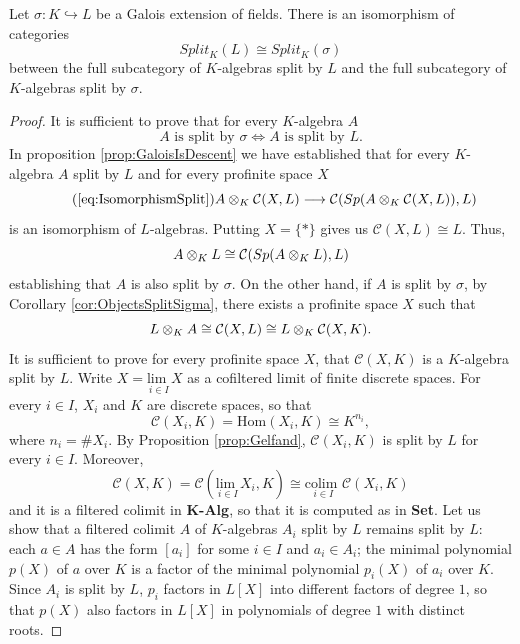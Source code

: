 \begin{proposition}
\label{prop:Split=Split}
    Let $\sigma: K\hookrightarrow L$ be a Galois extension of fields. There is an isomorphism of categories
    \[ Split_K(L)\cong Split_K(\sigma) \]
    between the full subcategory of $K$-algebras split by $L$ and the full subcategory of $K$-algebras split by $\sigma$.
    \begin{proof}
        It is sufficient to prove that for every $K$-algebra $A$
        \[ A \text{ is split by }\sigma \iff A \text{ is split by }L. \]
        In proposition \ref{prop:GaloisIsDescent} we have established that for every $K$-algebra $A$ split by $L$ and for every profinite space $X$
        \begin{equation}\tag{\ref{eq:IsomorphismSplit}}
            A\tens{K}\mathcal{C}(X,L)\longrightarrow \mathcal{C}(Sp(A\tens{K}\mathcal{C}(X,L)),L)
        \end{equation}
        is an isomorphism of $L$-algebras. Putting $X = \{*\}$ gives us $\mathcal{C}(X,L)\cong L$. Thus,
        \[ A\otimes_{K}L\cong \mathcal{C}(Sp(A\otimes_{K}L), L) \]
        establishing that $A$ is also split by $\sigma$. On the other hand, if $A$ is split by $\sigma$, by Corollary \ref{cor:ObjectsSplitSigma}, there exists a profinite space $X$ such that
        \[ L\otimes_{K}A\cong \mathcal{C}(X,L)\cong L\otimes_{K}\mathcal{C}(X,K). \]
        It is sufficient to prove for every profinite space $X$, that $\mathcal{C}(X,K)$ is a $K$-algebra split by $L$. Write $X = \underset{i\in I}{\text{lim }}X$ as a cofiltered limit of finite discrete spaces. For every $i\in I$, $X_i$ and $K$ are discrete spaces, so that
        \[ \mathcal{C}(X_i, K) = \text{Hom}(X_i, K)\cong K^{n_i}, \]
        where $n_i = \# X_i$. By Proposition \ref{prop:Gelfand}, $\mathcal{C}(X_i,K)$ is split by $L$ for every $i\in I$. Moreover,
        \[ \mathcal{C}(X,K) = \mathcal{C}(\underset{i\in I}{\text{lim }}X_i, K)\cong \underset{i\in I}{\text{colim }}\mathcal{C}(X_i, K) \]
        and it is a filtered colimit in \textbf{K-Alg}, so that it is computed as in \textbf{Set}. Let us show that a filtered colimit $A$ of $K$-algebras $A_i$ split by $L$ remains split by $L$: each $a\in A$ has the form $[a_i]$ for some $i\in I$ and $a_i\in A_i$; the minimal polynomial $p(X)$ of $a$ over $K$ is a factor of the minimal polynomial $p_i(X)$ of $a_i$ over $K$. Since $A_i$ is split by $L$, $p_i$ factors in $L[X]$ into different factors of degree $1$, so that $p(X)$ also factors in $L[X]$ in polynomials of degree $1$ with distinct roots.
    \end{proof}
\end{proposition}

